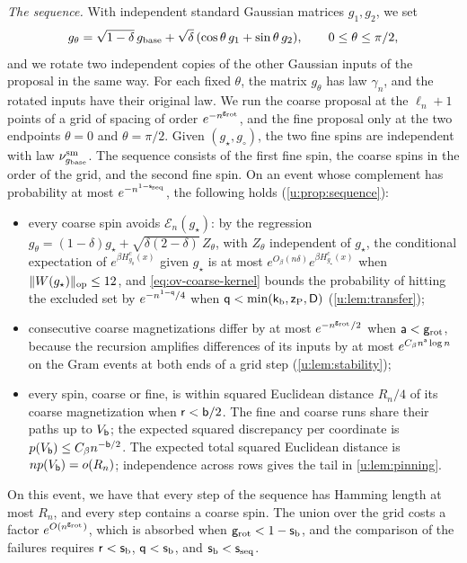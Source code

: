 \emph{The sequence.} With independent standard Gaussian matrices $g_1,g_2$,
we set
\[
 g_\theta=\sqrt{1-\delta}\,g_{\rm base}
 +\sqrt\delta\,(\cos\theta\,g_1+\sin\theta\,g_2),\qquad
 0\le\theta\le\pi/2,
\]
and we rotate two independent copies of the other Gaussian inputs of the
proposal in the same way. For each fixed $\theta$, the matrix $g_\theta$ has
law $\gamma_n$, and the rotated inputs have their original law. We run the
coarse proposal at the $\ell_n+1$ points of a grid of spacing of order
$e^{-n^{\mathsf{g}_{\rm rot}}}$, and the fine proposal only at the two endpoints
$\theta=0$ and $\theta=\pi/2$. Given $(g_\star,g_\circ)$, the two fine spins
are independent with law $\nu^{\rm sm}_{g_{\rm base}}$. The sequence consists
of the first fine spin, the coarse spins in the order of the grid, and the
second fine spin. On an event whose complement has probability at most
$e^{-n^{1-\mathsf{s}_{\rm seq}}}$, the following holds (\cref{u:prop:sequence}):
\begin{itemize}
\item every coarse spin avoids $\mathcal E_n(g_\star)$: by the regression
$g_\theta=(1-\delta)g_\star+\sqrt{\delta(2-\delta)}\,Z_\theta$, with
$Z_\theta$ independent of $g_\star$, the conditional expectation of
$e^{\beta H^c_{g_\theta}(x)}$ given $g_\star$ is at most
$e^{O_\beta(n\delta)}e^{\beta H^c_{g_\star}(x)}$ when
$\lVert W(g_\star)\rVert_{\rm op}\le12$, and
\eqref{eq:ov-coarse-kernel} bounds the probability of hitting the excluded
set by $e^{-n^{1-\mathsf{q}}/4}$ when $\mathsf{q}<\min(\mathsf{k}_{\rm b},\mathsf{z}_{\rm P},\mathsf{D})$
(\cref{u:lem:transfer});
\item consecutive coarse magnetizations differ by at most
$e^{-n^{\mathsf{g}_{\rm rot}}/2}$ when $\mathsf{a}<\mathsf{g}_{\rm rot}$, because the
recursion amplifies differences of its inputs by at most
$e^{C_\beta n^{\mathsf{a}}\log n}$ on the Gram events at both ends of a grid step
(\cref{u:lem:stability});
\item every spin, coarse or fine, is within squared Euclidean distance $R_n/4$
of its coarse magnetization when $\mathsf{r}<\mathsf{b}/2$.
The fine and coarse runs share their paths up to $V_{\mathsf{b}}$;
the expected squared discrepancy per coordinate is
$p(V_{\mathsf{b}})\le C_\beta n^{-\mathsf{b}/2}$. The expected total
squared Euclidean distance is $np(V_{\mathsf{b}})=o(R_n)$;
independence across rows gives the tail in \cref{u:lem:pinning}.
\end{itemize}
On this event, we have that every step of the sequence has Hamming length at
most $R_n$, and every step contains a coarse spin. The union over the grid costs a factor
$e^{O(n^{\mathsf{g}_{\rm rot}})}$, which is absorbed when
$\mathsf{g}_{\rm rot}<1-\mathsf{s}_{\rm b}$, and the comparison of the failures requires
$\mathsf{r}<\mathsf{s}_{\rm b}$, $\mathsf{q}<\mathsf{s}_{\rm b}$, and
$\mathsf{s}_{\rm b}<\mathsf{s}_{\rm seq}$.

